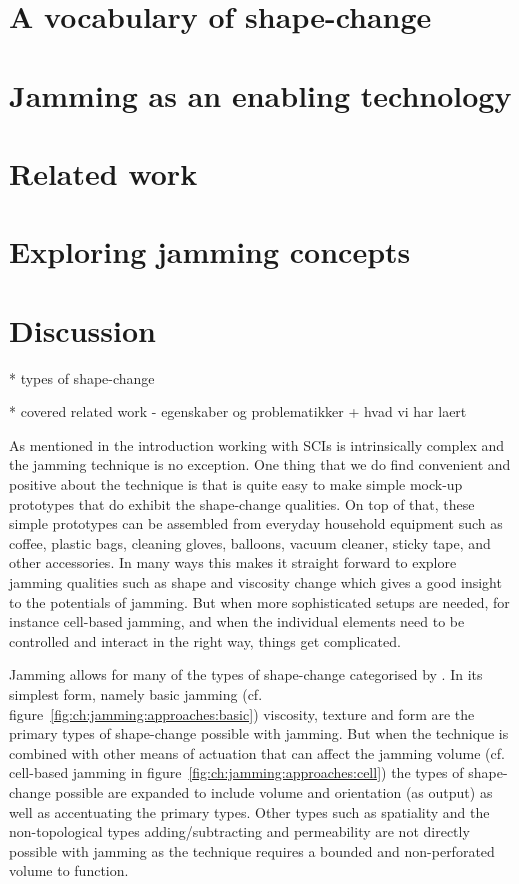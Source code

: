 \section{A vocabulary of shape-change}
\label{ch:jamming:shape-change} 


\section{Jamming as an enabling technology}
\label{ch:jamming:enabling-technology} 


\section{Related work}
\label{ch:jamming:related-work} 


\section{Exploring jamming concepts}
\label{ch:jamming:concepts} 


\section{Discussion}


* types of shape-change

* covered related work - egenskaber og problematikker + hvad vi har laert

As mentioned in the introduction working with SCIs is intrinsically complex and the jamming technique is no exception.
One thing that we do find convenient and positive about the technique is that is quite easy to make simple mock-up prototypes that do exhibit the shape-change qualities.
On top of that, these simple prototypes can be assembled from everyday household equipment such as coffee, plastic bags, cleaning gloves, balloons, vacuum cleaner, sticky tape, and other accessories.
In many ways this makes it straight forward to explore jamming qualities such as shape and viscosity change which gives a good insight to the potentials of jamming.
But when more sophisticated setups are needed, for instance cell-based jamming, and when the individual elements need to be controlled and interact in the right way, things get complicated.

Jamming allows for many of the types of shape-change categorised by \citet{rasmussen2012shape}.
In its simplest form, namely basic jamming (cf. figure~\ref{fig:ch:jamming:approaches:basic}) viscosity, texture and form are the primary types of shape-change possible with jamming.
But when the technique is combined with other means of actuation that can affect the jamming volume (cf. cell-based jamming in figure~\ref{fig:ch:jamming:approaches:cell}) the types of shape-change possible are expanded to include volume and orientation (as output) as well as accentuating the primary types.
Other types such as spatiality and the non-topological types adding/subtracting and permeability are not directly possible with jamming as the technique requires a bounded and non-perforated volume to function.


